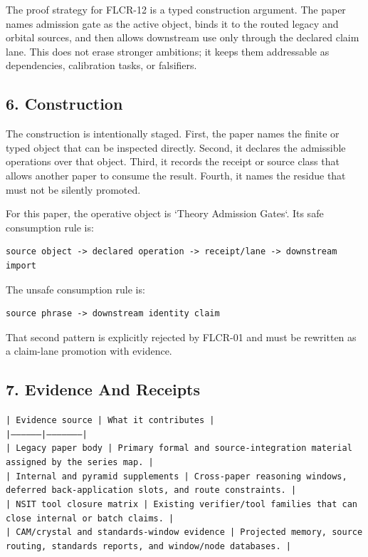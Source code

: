 \documentclass[11pt]{article}
\begin{document}
The proof strategy for FLCR-12 is a typed construction argument. The paper names admission gate as the active object, binds it to the routed legacy and orbital sources, and then allows downstream use only through the declared claim lane. This does not erase stronger ambitions; it keeps them addressable as dependencies, calibration tasks, or falsifiers.

\subsection*{6. Construction}

The construction is intentionally staged. First, the paper names the finite or
typed object that can be inspected directly. Second, it declares the admissible
operations over that object. Third, it records the receipt or source class that
allows another paper to consume the result. Fourth, it names the residue that
must not be silently promoted.

For this paper, the operative object is `Theory Admission Gates`. Its safe consumption
rule is:

\begin{verbatim}
source object -> declared operation -> receipt/lane -> downstream import
\end{verbatim}

The unsafe consumption rule is:

\begin{verbatim}
source phrase -> downstream identity claim
\end{verbatim}

That second pattern is explicitly rejected by FLCR-01 and must be rewritten as
a claim-lane promotion with evidence.

\subsection*{7. Evidence And Receipts}

\noindent\texttt{| Evidence source | What it contributes |}\\
\noindent\texttt{|-----------------|---------------------|}\\
\noindent\texttt{| Legacy paper body | Primary formal and source-integration material assigned by the series map. |}\\
\noindent\texttt{| Internal and pyramid supplements | Cross-paper reasoning windows, deferred back-application slots, and route constraints. |}\\
\noindent\texttt{| NSIT tool closure matrix | Existing verifier/tool families that can close internal or batch claims. |}\\
\noindent\texttt{| CAM/crystal and standards-window evidence | Projected memory, source routing, standards reports, and window/node databases. |}\\
\end{document}

